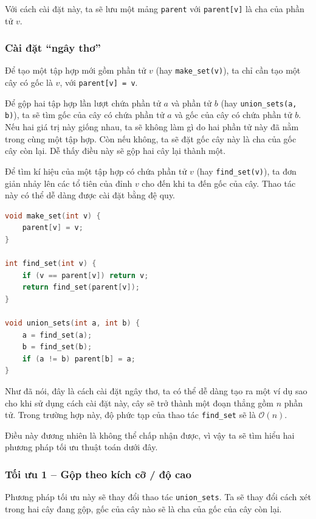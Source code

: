 \documentclass{article}
\begin{document}
Với cách cài đặt này, ta sẽ lưu một mảng \texttt{parent} với \texttt{parent[v]} là cha của phần tử $v$.


\subsubsection*{Cài đặt ``ngây thơ''}

Để tạo một tập hợp mới gồm phần tử $v$ (hay \texttt{make\_set(v)}), ta chỉ cần tạo một cây có gốc là $v$, với \texttt{parent[v] = v}.

Để gộp hai tập hợp lần lượt chứa phần tử $a$ và phần tử $b$ (hay \texttt{union\_sets(a, b)}), ta sẽ tìm gốc của cây có chứa phần tử $a$ và gốc của cây có chứa phần tử $b$. Nếu hai giá trị này giống nhau, ta sẽ không làm gì do hai phần tử này đã nằm trong cùng một tập hợp. Còn nếu không, ta sẽ đặt gốc cây này là cha của gốc cây còn lại. Dễ thấy điều này sẽ gộp hai cây lại thành một.

Để tìm kí hiệu của một tập hợp có chứa phần tử $v$ (hay \texttt{find\_set(v)}), ta đơn giản nhảy lên các tổ tiên của đỉnh $v$ cho đến khi ta đến gốc của cây. Thao tác này có thể dễ dàng được cài đặt bằng đệ quy.

\begin{lstlisting}[language=C++]
void make_set(int v) {
    parent[v] = v; 
}

int find_set(int v) {
    if (v == parent[v]) return v;
    return find_set(parent[v]); 
}

void union_sets(int a, int b) {
    a = find_set(a);
    b = find_set(b);
    if (a != b) parent[b] = a;
}
\end{lstlisting}

Như đã nói, đây là cách cài đặt ngây thơ, ta có thể dễ dàng tạo ra một ví dụ sao cho khi sử dụng cách cài đặt này, cây sẽ trở thành một đoạn thẳng gồm $n$ phần tử. Trong trường hợp này, độ phức tạp của thao tác \texttt{find\_set} sẽ là $\mathcal{O}(n)$.

Điều này đương nhiên là không thể chấp nhận được, vì vậy ta sẽ tìm hiểu hai phương pháp tối ưu thuật toán dưới đây.

\subsubsection*{Tối ưu 1 -- Gộp theo kích cỡ / độ cao}

Phương pháp tối ưu này sẽ thay đổi thao tác \texttt{union\_sets}. Ta sẽ thay đổi cách xét trong hai cây đang gộp, gốc của cây nào sẽ là cha của gốc của cây còn lại.
\end{document}

